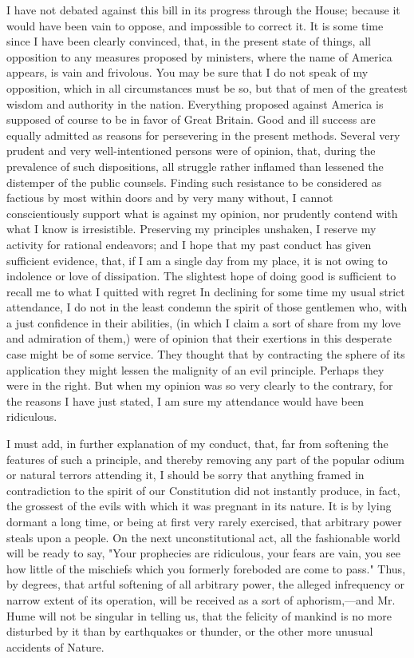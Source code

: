 I have not debated against this bill in its progress through the House; because it would have been vain to oppose, and impossible to correct it. It is some time since I have been clearly convinced, that, in the present state of things, all opposition to any measures proposed by ministers, where the name of America appears, is vain and frivolous. You may be sure that I do not speak of my opposition, which in all circumstances must be so, but that of men of the greatest wisdom and authority in the nation. Everything proposed against America is supposed of course to be in favor of Great Britain. Good and ill success are equally admitted as reasons for persevering in the present methods. Several very prudent and very well-intentioned persons were of opinion, that, during the prevalence of such dispositions, all struggle rather inflamed than lessened the distemper of the public counsels. Finding such resistance to be considered as factious by most within doors and by very many without, I cannot conscientiously support what is against my opinion, nor prudently contend with what I know is irresistible. Preserving my principles unshaken, I reserve my activity for rational endeavors; and I hope that my past conduct has given sufficient evidence, that, if I am a single day from my place, it is not owing to indolence or love of dissipation. The slightest hope of doing good is sufficient to recall me to what I quitted with regret In declining for some time my usual strict attendance, I do not in the least condemn the spirit of those gentlemen who, with a just confidence in their abilities, (in which I claim a sort of share from my love and admiration of them,) were of opinion that their exertions in this desperate case might be of some service. They thought that by contracting the sphere of its application they might lessen the malignity of an evil principle. Perhaps they were in the right. But when my opinion was so very clearly to the contrary, for the reasons I have just stated, I am sure my attendance would have been ridiculous.

I must add, in further explanation of my conduct, that, far from softening the features of such a principle, and thereby removing any part of the popular odium or natural terrors attending it, I should be sorry that anything framed in contradiction to the spirit of our Constitution did not instantly produce, in fact, the grossest of the evils with which it was pregnant in its nature. It is by lying dormant a long time, or being at first very rarely exercised, that arbitrary power steals upon a people. On the next unconstitutional act, all the fashionable world will be ready to say, "Your prophecies are ridiculous, your fears are vain, you see how little of the mischiefs which you formerly foreboded are come to pass." Thus, by degrees, that artful softening of all arbitrary power, the alleged infrequency or narrow extent of its operation, will be received as a sort of aphorism,—and Mr. Hume will not be singular in telling us, that the felicity of mankind is no more disturbed by it than by earthquakes or thunder, or the other more unusual accidents of Nature.

